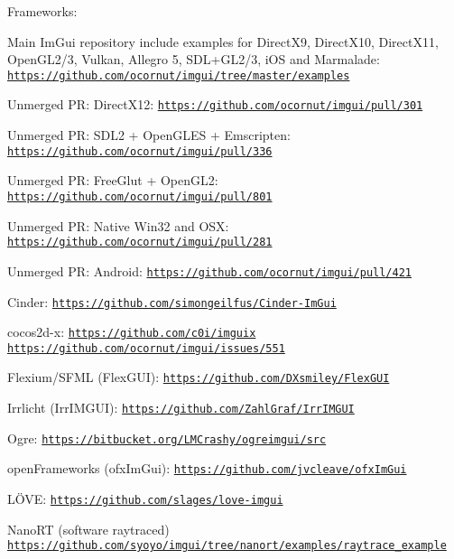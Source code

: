 Frameworks\+:
\begin{DoxyItemize}
\item Main Im\+Gui repository include examples for Direct\+X9, Direct\+X10, Direct\+X11, Open\+G\+L2/3, Vulkan, Allegro 5, S\+D\+L+\+G\+L2/3, i\+OS and Marmalade\+: \href{https://github.com/ocornut/imgui/tree/master/examples}{\tt https\+://github.\+com/ocornut/imgui/tree/master/examples}
\item Unmerged PR\+: Direct\+X12\+: \href{https://github.com/ocornut/imgui/pull/301}{\tt https\+://github.\+com/ocornut/imgui/pull/301}
\item Unmerged PR\+: S\+D\+L2 + Open\+G\+L\+ES + Emscripten\+: \href{https://github.com/ocornut/imgui/pull/336}{\tt https\+://github.\+com/ocornut/imgui/pull/336}
\item Unmerged PR\+: Free\+Glut + Open\+G\+L2\+: \href{https://github.com/ocornut/imgui/pull/801}{\tt https\+://github.\+com/ocornut/imgui/pull/801}
\item Unmerged PR\+: Native Win32 and O\+SX\+: \href{https://github.com/ocornut/imgui/pull/281}{\tt https\+://github.\+com/ocornut/imgui/pull/281}
\item Unmerged PR\+: Android\+: \href{https://github.com/ocornut/imgui/pull/421}{\tt https\+://github.\+com/ocornut/imgui/pull/421}
\item Cinder\+: \href{https://github.com/simongeilfus/Cinder-ImGui}{\tt https\+://github.\+com/simongeilfus/\+Cinder-\/\+Im\+Gui}
\item cocos2d-\/x\+: \href{https://github.com/c0i/imguix}{\tt https\+://github.\+com/c0i/imguix} \href{https://github.com/ocornut/imgui/issues/551}{\tt https\+://github.\+com/ocornut/imgui/issues/551}
\item Flexium/\+S\+F\+ML (Flex\+G\+UI)\+: \href{https://github.com/DXsmiley/FlexGUI}{\tt https\+://github.\+com/\+D\+Xsmiley/\+Flex\+G\+UI}
\item Irrlicht (Irr\+I\+M\+G\+UI)\+: \href{https://github.com/ZahlGraf/IrrIMGUI}{\tt https\+://github.\+com/\+Zahl\+Graf/\+Irr\+I\+M\+G\+UI}
\item Ogre\+: \href{https://bitbucket.org/LMCrashy/ogreimgui/src}{\tt https\+://bitbucket.\+org/\+L\+M\+Crashy/ogreimgui/src}
\item open\+Frameworks (ofx\+Im\+Gui)\+: \href{https://github.com/jvcleave/ofxImGui}{\tt https\+://github.\+com/jvcleave/ofx\+Im\+Gui}
\item LÖ\+VE\+: \href{https://github.com/slages/love-imgui}{\tt https\+://github.\+com/slages/love-\/imgui}
\item Nano\+RT (software raytraced) \href{https://github.com/syoyo/imgui/tree/nanort/examples/raytrace_example}{\tt https\+://github.\+com/syoyo/imgui/tree/nanort/examples/raytrace\+\_\+example}

\end{DoxyItemize}
